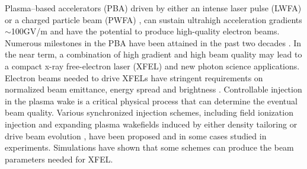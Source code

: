 \documentclass[
aps,
prl,
reprint,
superscriptaddress,
amsmath,
amssymb,
showpacs
]{revtex4-2}
\begin{document}


\maketitle

Plasma–based accelerators (PBA) driven by either an intense laser pulse (LWFA) or a charged particle beam (PWFA) \cite{Joshi2003}, can sustain ultrahigh acceleration gradients $\sim$100GV/m and have the potential to produce high-quality electron beams. Numerous milestones in the PBA have been attained in the past two decades \cite{Joshi2020}. In the near term, a combination of high gradient and high beam quality may lead to a compact x-ray free-electron laser (XFEL) \cite{Wang2021,Xu2021} and new photon science applications. Electron beams needed to drive XFELs have stringent requirements on normalized beam emittance, energy spread and brightness \cite{Pellegrini2016}. Controllable injection in the plasma wake is a critical physical process that can determine the eventual beam quality. Various synchronized injection schemes, including field ionization injection \cite{Chen2006,Oz2007,Pak2010,Hidding2012,Li2013,MartinezDeLaOssa2013,Xu2014} and expanding plasma wakefields induced by either density tailoring \cite{Bulanov1998,Suk2001,Buck2013,Geddes2008,Xu2017} or drive beam evolution \cite{Kalmykov2009,Lehe2013,Dalichaouch2020}, have been proposed and in some cases studied in experiments. Simulations have shown that some schemes can produce the beam parameters needed for XFEL.
\end{document}
